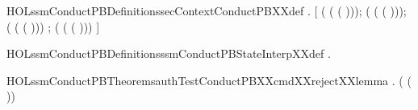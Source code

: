 \newcommand{\HOLssmConductPBDate}{16 May 2018}
\newcommand{\HOLssmConductPBTime}{16:33}
\begin{SaveVerbatim}{HOLssmConductPBDefinitionssecContextConductPBXXdef}
\HOLTokenTurnstile{} \HOLSymConst{\HOLTokenForall{}}  .
         \HOLSymConst{=}
     [    ( ( ( )));
        
       ( ( ( )));
        
       ( ( ( )))   ;
        
       ( ( ( )))   ]
\end{SaveVerbatim}
\newcommand{\HOLssmConductPBDefinitionssecContextConductPBXXdef}{\UseVerbatim{HOLssmConductPBDefinitionssecContextConductPBXXdef}}
\begin{SaveVerbatim}{HOLssmConductPBDefinitionsssmConductPBStateInterpXXdef}
\HOLTokenTurnstile{} \HOLSymConst{\HOLTokenForall{}}.   \HOLSymConst{=} 
\end{SaveVerbatim}
\newcommand{\HOLssmConductPBDefinitionsssmConductPBStateInterpXXdef}{\UseVerbatim{HOLssmConductPBDefinitionsssmConductPBStateInterpXXdef}}
\newcommand{\HOLssmConductPBDefinitions}{
\HOLDfnTag{ssmConductPB}{secContextConductPB_def}\HOLssmConductPBDefinitionssecContextConductPBXXdef
\HOLDfnTag{ssmConductPB}{ssmConductPBStateInterp_def}\HOLssmConductPBDefinitionsssmConductPBStateInterpXXdef
}
\begin{SaveVerbatim}{HOLssmConductPBTheoremsauthTestConductPBXXcmdXXrejectXXlemma}
\HOLTokenTurnstile{} \HOLSymConst{\HOLTokenForall{}}. \HOLSymConst{\HOLTokenNeg{}} ( ( ))
\end{SaveVerbatim}
\newcommand{\HOLssmConductPBTheoremsauthTestConductPBXXcmdXXrejectXXlemma}{\UseVerbatim{HOLssmConductPBTheoremsauthTestConductPBXXcmdXXrejectXXlemma}}
